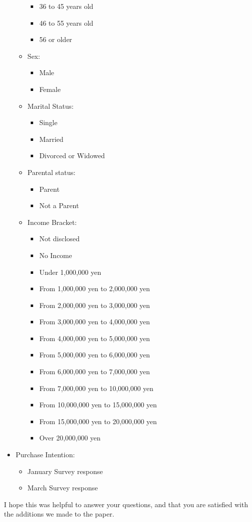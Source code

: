 \documentclass[review]{elsarticle}
\begin{document}
\begin{itemize}
\begin{itemize}
\begin{itemize}
            \item 36 to 45 years old
            \item 46 to 55 years old
            \item 56 or older
        \end{itemize}
        \item Sex:
        \begin{itemize}
            \item Male
            \item Female
        \end{itemize}
        \item Marital Status:
        \begin{itemize}
            \item Single
            \item Married
            \item Divorced or Widowed
        \end{itemize}
        \item Parental status:
        \begin{itemize}
            \item Parent
            \item Not a Parent
        \end{itemize}
        \item Income Bracket:
        \begin{itemize}
            \item Not disclosed
            \item No Income
            \item Under 1,000,000 yen
            \item From 1,000,000 yen to 2,000,000 yen
            \item From 2,000,000 yen to 3,000,000 yen
            \item From 3,000,000 yen to 4,000,000 yen
            \item From 4,000,000 yen to 5,000,000 yen
            \item From 5,000,000 yen to 6,000,000 yen
            \item From 6,000,000 yen to 7,000,000 yen
            \item From 7,000,000 yen to 10,000,000 yen
            \item From 10,000,000 yen to 15,000,000 yen
            \item From 15,000,000 yen to 20,000,000 yen
            \item Over 20,000,000 yen
        \end{itemize}
    \end{itemize}
    \item Purchase Intention:
    \begin{itemize}
        \item January Survey response
        \item March Survey response
    \end{itemize}
\end{itemize}

I hope this was helpful to answer your questions, and that you are satisfied with the additions we made to the paper.
\end{document}
